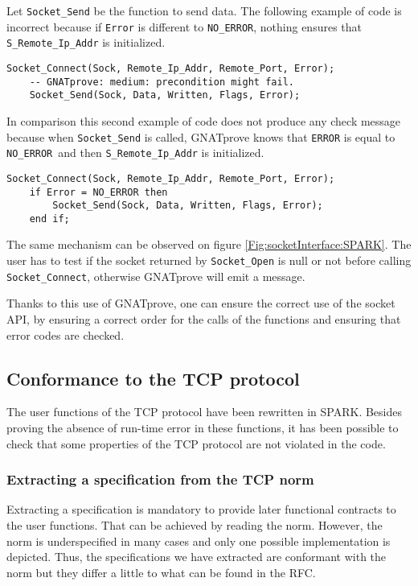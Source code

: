\documentclass[runningheads]{llncs}
\begin{document}
    Let \lstinline[style=Spark]{Socket_Send} be the function to send data. The following example of code is incorrect because if \lstinline{Error} is
    different to \lstinline{NO_ERROR}, nothing ensures that \lstinline{S_Remote_Ip_Addr} is initialized.
    \begin{lstlisting}[style=Spark]
    Socket_Connect(Sock, Remote_Ip_Addr, Remote_Port, Error);
    -- GNATprove: medium: precondition might fail.
    Socket_Send(Sock, Data, Written, Flags, Error);
    \end{lstlisting}
    In comparison this second example of code does not produce any check message because when \lstinline[style=Spark]{Socket_Send} is called, GNATprove knows that
    \lstinline[style=Spark]{ERROR} is equal to \lstinline[style=Spark]{NO_ERROR} and then \lstinline[style=Spark]{S_Remote_Ip_Addr} is initialized.
    \begin{lstlisting}[style=Spark]
    Socket_Connect(Sock, Remote_Ip_Addr, Remote_Port, Error);
    if Error = NO_ERROR then
        Socket_Send(Sock, Data, Written, Flags, Error);
    end if;
    \end{lstlisting}

    The same mechanism can be observed on figure \ref{Fig:socketInterface:SPARK}. The user has to test if the socket returned by
    \lstinline[style=Spark]{Socket_Open} is null or not before calling \lstinline[style=Spark]{Socket_Connect}, otherwise GNATprove will emit a message.

    Thanks to this use of GNATprove, one can ensure the correct use of the socket API, by ensuring a correct order for the
    calls of the functions and ensuring that error codes are checked.


\subsection{Conformance to the TCP protocol}

    The user functions of the TCP protocol have been rewritten in SPARK. Besides proving the absence of run-time error in these functions,
    it has been possible to check that some properties of the TCP protocol are not violated in the code.

\subsubsection{Extracting a specification from the TCP norm}

    Extracting a specification is mandatory to provide later functional contracts to the user functions.
    That can be achieved by reading the norm. However, the norm is underspecified in many cases and only one possible implementation
    is depicted. Thus, the specifications we have extracted are conformant with the norm but they differ a little to
    what can be found in the RFC.
\end{document}
